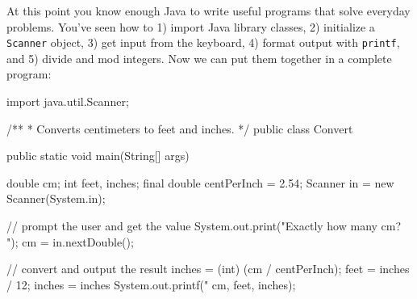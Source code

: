 \documentclass[12pt]{book}
\theoremstyle{exercise}
\newcommand{\java}[1]{\lstinline{#1}} %
\begin{document}


At this point you know enough Java to write useful programs that solve everyday problems.
You've seen how to 1) import Java library classes, 2) initialize a \java{Scanner} object, 3) get input from the keyboard, 4) format output with \java{printf}, and 5) divide and mod integers.
Now we can put them together in a complete program:


\begin{code}
import java.util.Scanner;

/**
 * Converts centimeters to feet and inches.
 */
public class Convert {
    public static void main(String[] args) {
        double cm;
        int feet, inches;
        final double centPerInch = 2.54;
        Scanner in = new Scanner(System.in);

        // prompt the user and get the value
        System.out.print("Exactly how many cm? ");
        cm = in.nextDouble();

        // convert and output the result
        inches = (int) (cm / centPerInch);
        feet = inches / 12;
        inches = inches %
        System.out.printf("%
                          cm, feet, inches);
    }
}
\end{code}
\end{document}
